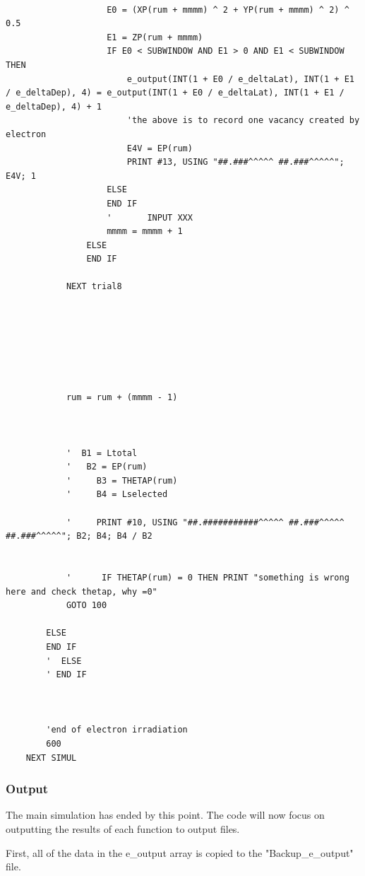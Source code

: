 \documentclass[10pt, reqno]{exam}
\begin{document}
\begin{verbatim}

                    E0 = (XP(rum + mmmm) ^ 2 + YP(rum + mmmm) ^ 2) ^ 0.5
                    E1 = ZP(rum + mmmm)
                    IF E0 < SUBWINDOW AND E1 > 0 AND E1 < SUBWINDOW THEN
                        e_output(INT(1 + E0 / e_deltaLat), INT(1 + E1 / e_deltaDep), 4) = e_output(INT(1 + E0 / e_deltaLat), INT(1 + E1 / e_deltaDep), 4) + 1
                        'the above is to record one vacancy created by electron
                        E4V = EP(rum)
                        PRINT #13, USING "##.###^^^^^ ##.###^^^^^"; E4V; 1
                    ELSE
                    END IF
                    '       INPUT XXX
                    mmmm = mmmm + 1
                ELSE
                END IF
    
            NEXT trial8
    
    
    
    
    
    
    
            rum = rum + (mmmm - 1)
    
    
    
            '  B1 = Ltotal
            '   B2 = EP(rum)
            '     B3 = THETAP(rum)
            '     B4 = Lselected
    
            '     PRINT #10, USING "##.###########^^^^^ ##.###^^^^^ ##.###^^^^^"; B2; B4; B4 / B2
    
    
            '      IF THETAP(rum) = 0 THEN PRINT "something is wrong here and check thetap, why =0"
            GOTO 100
    
        ELSE
        END IF
        '  ELSE
        ' END IF
    
    
    
        'end of electron irradiation
        600
    NEXT SIMUL
\end{verbatim}

\subsubsection{Output}

The main simulation has ended by this point. The code will now focus on outputting the results of each function to output files. \par

First, all of the data in the e\_output array is copied to the "Backup\_e\_output" file. \par
\end{document}
